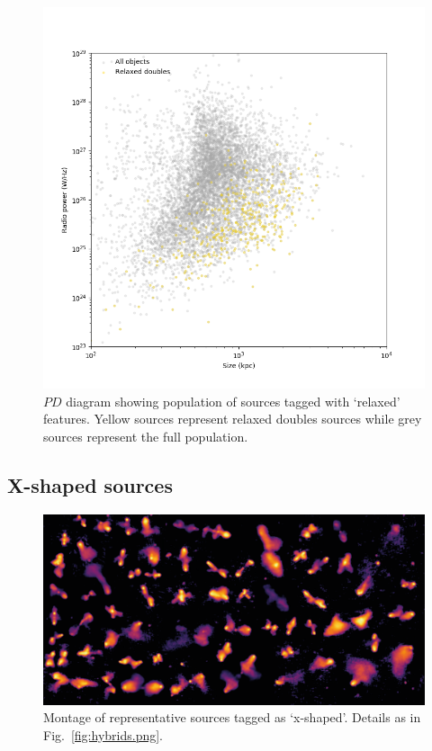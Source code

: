 \documentclass{aa}
\begin{document}
\begin{figure}
\includegraphics[width=1\linewidth]{Images/results/scatter_relaxed.png}
\caption{$PD$ diagram showing population of sources tagged with `relaxed' features. Yellow sources represent relaxed doubles sources while grey sources represent the full population.}
\label{fig:scatter_relaxed.png}
\end{figure}

\subsection{X-shaped sources}\label{subsec:xshaped}

\begin{figure}
\includegraphics[width=1\linewidth]{Images/galaxies/xshaped.png}
\caption{Montage of representative sources tagged as `x-shaped'. Details as in Fig.\ \ref{fig:hybrids.png}.}
\label{fig:xshaped.png}
\end{figure}
\end{document}
